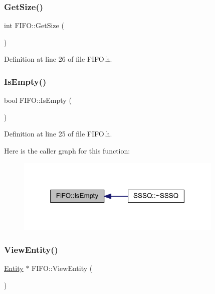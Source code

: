 \subsubsection{\texorpdfstring{Get\+Size()}{GetSize()}}
{\footnotesize\ttfamily int F\+I\+F\+O\+::\+Get\+Size (\begin{DoxyParamCaption}{ }\end{DoxyParamCaption})\hspace{0.3cm}{\ttfamily [inline]}}



Definition at line 26 of file F\+I\+F\+O.\+h.

\mbox{\label{class_f_i_f_o_a8dd1be7a3e1ada7cafe5fc85a7211408}} 
\subsubsection{\texorpdfstring{Is\+Empty()}{IsEmpty()}}
{\footnotesize\ttfamily bool F\+I\+F\+O\+::\+Is\+Empty (\begin{DoxyParamCaption}{ }\end{DoxyParamCaption})\hspace{0.3cm}{\ttfamily [inline]}}



Definition at line 25 of file F\+I\+F\+O.\+h.

Here is the caller graph for this function\+:
\nopagebreak
\begin{figure}[H]
\begin{center}
\leavevmode
\includegraphics[width=280pt]{class_f_i_f_o_a8dd1be7a3e1ada7cafe5fc85a7211408_icgraph}
\end{center}
\end{figure}
\mbox{\label{class_f_i_f_o_a4ce6b8e9afc3c29c9a7f1a4e0fdc81ec}} 
\subsubsection{\texorpdfstring{View\+Entity()}{ViewEntity()}}
{\footnotesize\ttfamily \hyperlink{class_entity}{Entity} $\ast$ F\+I\+F\+O\+::\+View\+Entity (\begin{DoxyParamCaption}{ }\end{DoxyParamCaption})}



